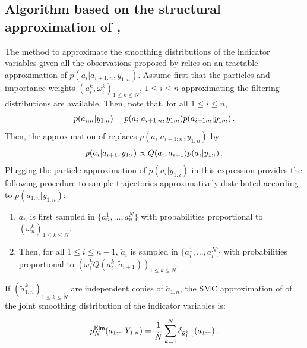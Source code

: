 

\subsection{Algorithm based on the structural approximation of \cite{kim:1994}, \cite{barber:2006}}
The method to approximate the smoothing distributions of the indicator variables given all the observations proposed by \cite{barber:2006} relies on an tractable approximation of $p(a_i|a_{i+1:n},y_{1:n})$. Assume first that the particles and importance weights $(a_i^k,\omega_i^k)_{1\le k \le N}$, $1\le i\le n$ approximating the filtering distributions are available. Then, note that, for all $1\le i\le n$,
\[
p(a_{i:n}|y_{1:n}) = p(a_{i}|a_{i+1:n},y_{1:n})p(a_{i+1:n}|y_{1:n})\,.
\]
Then, the approximation of \cite{kim:1994,barber:2006} replaces $p(a_i|a_{i+1:n},y_{1:n})$ by
\[
p(a_i|a_{i+1},y_{1:i}) \propto Q(a_i,a_{i+1})p(a_i|y_{1:i})\,.
\]
Plugging the particle approximation of $p(a_i|y_{1:i})$ in this expression provides the following procedure to sample trajectories approximatively distributed according to $p(a_{1:n}|y_{1:n})$:
\begin{enumerate}[-]
\item $\tilde{a}_{n}$ is first sampled in $\{a_n^1,\ldots,a_n^N\}$ with probabilities proportional to $(\omega_n^k)_{1\le k \le N}$.
\item Then, for all $1\le i \le n-1$, $\tilde{a}_{i}$ is sampled in $\{a_i^1,\ldots,a_i^N\}$ with probabilities proportional to $(\omega_i^kQ(a_i^k,\tilde{a}_{i+1}))_{1\le k \le N}$.
\end{enumerate}
If $(\tilde{a}^k_{1:n})_{1\le k \le \tilde{N}}$ are independent copies of $\tilde{a}_{1:n}$, the SMC approximation of \cite{kim:1994} of the joint smoothing distribution of the indicator variables is:
\[
p^{\mathsf{Kim}}_N(a_{1:n}|Y_{1:n}) = \frac{1}{\tilde{N}}\sum_{k=1}^{\tilde N} \delta_{\tilde{a}^{k}_{1:n}}(a_{1:n})\,.
\]

